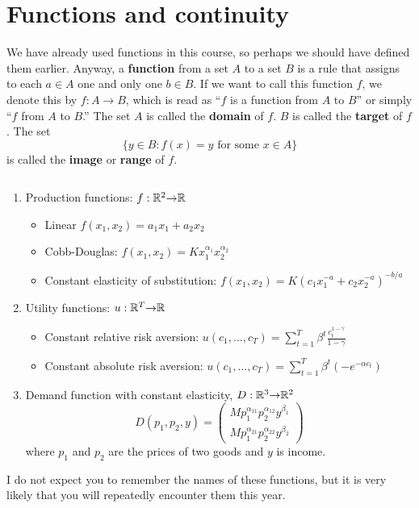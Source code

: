 \section{Functions and continuity}

We have already used functions in this course, so perhaps we should
have defined them earlier. Anyway, a \textbf{function} from a set $A$
to a set $B$ is a rule that assigns to each $a \in A$ one and only one
$b \in B$. If we want to call this function $f$, we denote this by
$f:A \to B$, which is read as ``$f$ is a function from $A$ to $B$'' or
simply ``$f$ from $A$ to $B$.'' The set $A$ is called the
\textbf{domain} of $f$. $B$ is called the \textbf{target} of $f$. The
set 
\[ \{y  \in B:  f(x) = y \text{ for some } x \in A \} \]
is called the \textbf{image} or \textbf{range} of $f$. 


\begin{example}$\;$
\begin{enumerate}
\item Production functions: $f:\mathbb{R}^2 {\rightarrow} \mathbb{R}$ 
  \begin{itemize}
  \item Linear $ f(x_1,x_2) = a_1 x_1 + a_2 x_2 $
  \item Cobb-Douglas: $f(x_1,x_2) = K x_1^{\alpha_1} x_2^{\alpha_2}$
  \item Constant elasticity of substitution: $f(x_1,x_2) = K (c_1
    x_1^{-a} + c_2 x_2^{-a})^{-b/a}$
  \end{itemize}
\item Utility functions: $u: \mathbb{R}^T {\rightarrow} \mathbb{R}$
  \begin{itemize}
  \item Constant relative risk aversion: $u(c_1,...,c_T) =
    \sum_{t=1}^T \beta^t \frac{c_t^{1-\gamma}}{1-\gamma}$
  \item Constant absolute risk aversion: $u(c_1,...,c_T) =
    \sum_{t=1}^T \beta^t (-e^{-\alpha c_t})$
  \end{itemize}
\item Demand function with constant elasticity,  $D:\mathbb{R}^3 {\rightarrow} \mathbb{R}^2$
  \[ D(p_1,p_2,y) = \begin{pmatrix} M p_1^{\alpha_{11}}
    p_2^{\alpha_{12}} y^{\beta_1} \\
    M p_1^{\alpha_{21}} p_2^{\alpha_{22}} y^{\beta_2}
  \end{pmatrix}
  \]  
  where $p_1$ and $p_2$ are the prices of two goods and $y$ is income.
\end{enumerate}
I do not expect you to remember the names of these functions, but it
is very likely that you will repeatedly encounter them this year. 
\end{example}

